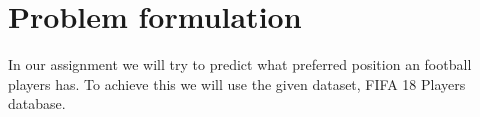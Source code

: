 \section{Problem formulation}
In our assignment we will try to predict what preferred position an football players has. To achieve this we will use the given dataset, FIFA 18 Players database. 